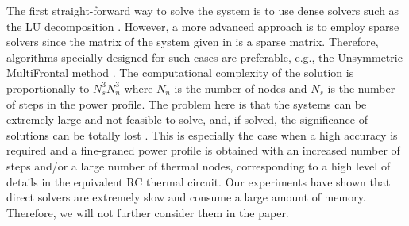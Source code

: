 The first straight-forward way to solve the system is to use dense solvers such as the LU decomposition \cite{press2007}. However, a more advanced approach is to employ sparse solvers since the matrix of the system given in  is a sparse matrix. Therefore, algorithms specially designed for such cases are preferable, e.g., the Unsymmetric MultiFrontal method \cite{umfpack2004}. The computational complexity of the solution is proportionally to $N_s^3 N_n^3$ \cite{press2007} where $N_n$ is the number of nodes and $N_s$ is the number of steps in the power profile. The problem here is that the systems can be extremely large and not feasible to solve, and, if solved, the significance of solutions can be totally lost \cite{press2007}. This is especially the case when a high accuracy is required and a fine-graned power profile is obtained with an increased number of steps and/or a large number of thermal nodes, corresponding to a high level of details in the equivalent RC thermal circuit. Our experiments have shown that direct solvers are extremely slow and consume a large amount of memory. Therefore, we will not further consider them in the paper.
